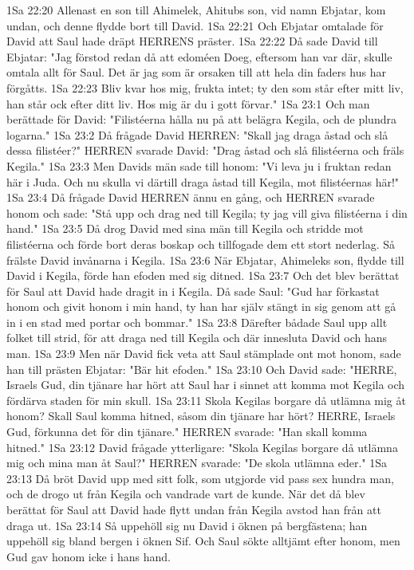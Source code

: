 1Sa 22:20  Allenast en son till Ahimelek, Ahitubs son, vid namn Ebjatar, kom undan, och denne flydde bort till David.
1Sa 22:21  Och Ebjatar omtalade för David att Saul hade dräpt HERRENS präster.
1Sa 22:22  Då sade David till Ebjatar: "Jag förstod redan då att edoméen Doeg, eftersom han var där, skulle omtala allt för Saul. Det är jag som är orsaken till att hela din faders hus har förgåtts.
1Sa 22:23  Bliv kvar hos mig, frukta intet; ty den som står efter mitt liv, han står ock efter ditt liv. Hos mig är du i gott förvar."
1Sa 23:1  Och man berättade för David: "Filistéerna hålla nu på att belägra Kegila, och de plundra logarna."
1Sa 23:2  Då frågade David HERREN: "Skall jag draga åstad och slå dessa filistéer?" HERREN svarade David: "Drag åstad och slå filistéerna och fräls Kegila."
1Sa 23:3  Men Davids män sade till honom: "Vi leva ju i fruktan redan här i Juda. Och nu skulla vi därtill draga åstad till Kegila, mot filistéernas här!"
1Sa 23:4  Då frågade David HERREN ännu en gång, och HERREN svarade honom och sade: "Stå upp och drag ned till Kegila; ty jag vill giva filistéerna i din hand."
1Sa 23:5  Då drog David med sina män till Kegila och stridde mot filistéerna och förde bort deras boskap och tillfogade dem ett stort nederlag. Så frälste David invånarna i Kegila.
1Sa 23:6  När Ebjatar, Ahimeleks son, flydde till David i Kegila, förde han efoden med sig ditned.
1Sa 23:7  Och det blev berättat för Saul att David hade dragit in i Kegila. Då sade Saul: "Gud har förkastat honom och givit honom i min hand, ty han har själv stängt in sig genom att gå in i en stad med portar och bommar."
1Sa 23:8  Därefter bådade Saul upp allt folket till strid, för att draga ned till Kegila och där innesluta David och hans man.
1Sa 23:9  Men när David fick veta att Saul stämplade ont mot honom, sade han till prästen Ebjatar: "Bär hit efoden."
1Sa 23:10  Och David sade: "HERRE, Israels Gud, din tjänare har hört att Saul har i sinnet att komma mot Kegila och fördärva staden för min skull.
1Sa 23:11  Skola Kegilas borgare då utlämna mig åt honom? Skall Saul komma hitned, såsom din tjänare har hört? HERRE, Israels Gud, förkunna det för din tjänare." HERREN svarade: "Han skall komma hitned."
1Sa 23:12  David frågade ytterligare: "Skola Kegilas borgare då utlämna mig och mina man åt Saul?" HERREN svarade: "De skola utlämna eder."
1Sa 23:13  Då bröt David upp med sitt folk, som utgjorde vid pass sex hundra man, och de drogo ut från Kegila och vandrade vart de kunde. När det då blev berättat för Saul att David hade flytt undan från Kegila avstod han från att draga ut.
1Sa 23:14  Så uppehöll sig nu David i öknen på bergfästena; han uppehöll sig bland bergen i öknen Sif. Och Saul sökte alltjämt efter honom, men Gud gav honom icke i hans hand.
